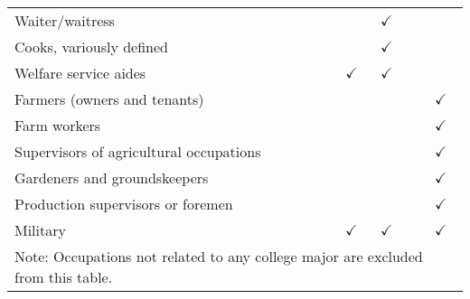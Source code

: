 \begin{tabular}[t]{llllll}
Waiter/waitress &  &  & $\checkmark$ &  & \\
Cooks, variously defined &  &  & $\checkmark$ &  & \\
Welfare service aides &  & $\checkmark$ & $\checkmark$ &  & \\
Farmers (owners and tenants) &  &  &  &  & $\checkmark$\\
Farm workers &  &  &  &  & $\checkmark$\\
Supervisors of agricultural occupations &  &  &  &  & $\checkmark$\\
Gardeners and groundskeepers &  &  &  &  & $\checkmark$\\
Production supervisors or foremen &  &  &  &  & $\checkmark$\\
Military &  & $\checkmark$ & $\checkmark$ &  & $\checkmark$\\
\bottomrule
\multicolumn{6}{l}{\textsuperscript{} Note: Occupations not related to any college major are excluded from this table.}\\
\end{tabular}

